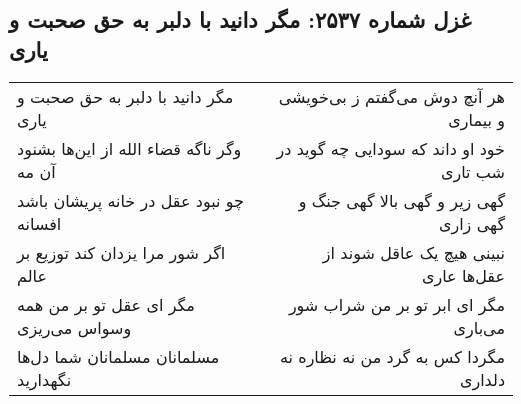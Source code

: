 \begin{center}
\section*{غزل شماره ۲۵۳۷: مگر دانید با دلبر به حق صحبت و یاری}
\label{sec:2537}
\begin{longtable}{l p{0.5cm} r}
مگر دانید با دلبر به حق صحبت و یاری
&&
هر آنچ دوش می‌گفتم ز بی‌خویشی و بیماری
\\
وگر ناگه قضاء الله از این‌ها بشنود آن مه
&&
خود او داند که سودایی چه گوید در شب تاری
\\
چو نبود عقل در خانه پریشان باشد افسانه
&&
گهی زیر و گهی بالا گهی جنگ و گهی زاری
\\
اگر شور مرا یزدان کند توزیع بر عالم
&&
نبینی هیچ یک عاقل شوند از عقل‌ها عاری
\\
مگر ای عقل تو بر من همه وسواس می‌ریزی
&&
مگر ای ابر تو بر من شراب شور می‌باری
\\
مسلمانان مسلمانان شما دل‌ها نگهدارید
&&
مگردا کس به گرد من نه نظاره نه دلداری
\\
\end{longtable}
\end{center}
